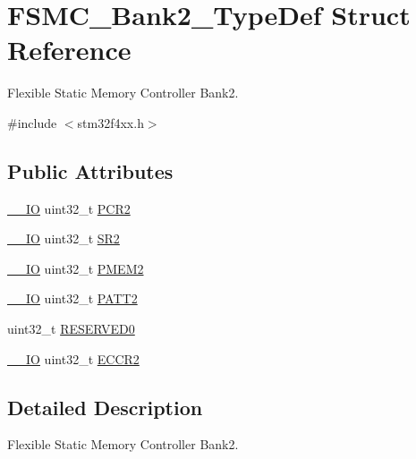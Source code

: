 \hypertarget{struct_f_s_m_c___bank2___type_def}{}\section{F\+S\+M\+C\+\_\+\+Bank2\+\_\+\+Type\+Def Struct Reference}
\label{struct_f_s_m_c___bank2___type_def}


Flexible Static Memory Controller Bank2.  




{\ttfamily \#include $<$stm32f4xx.\+h$>$}

\subsection*{Public Attributes}
\begin{DoxyCompactItemize}
\item 
\hyperlink{core__cm4_8h_aec43007d9998a0a0e01faede4133d6be}{\+\_\+\+\_\+\+IO} uint32\+\_\+t \hyperlink{struct_f_s_m_c___bank2___type_def_ad1eabc89a4eadb5cc6a42c1e39a39ff8}{P\+C\+R2}
\item 
\hyperlink{core__cm4_8h_aec43007d9998a0a0e01faede4133d6be}{\+\_\+\+\_\+\+IO} uint32\+\_\+t \hyperlink{struct_f_s_m_c___bank2___type_def_a38ad7403e05c899dc266cf47f932cc8f}{S\+R2}
\item 
\hyperlink{core__cm4_8h_aec43007d9998a0a0e01faede4133d6be}{\+\_\+\+\_\+\+IO} uint32\+\_\+t \hyperlink{struct_f_s_m_c___bank2___type_def_a29b2b75e74520e304e31c18cf9e4a7f8}{P\+M\+E\+M2}
\item 
\hyperlink{core__cm4_8h_aec43007d9998a0a0e01faede4133d6be}{\+\_\+\+\_\+\+IO} uint32\+\_\+t \hyperlink{struct_f_s_m_c___bank2___type_def_a9b2c273e4b84f24efbd731bd4ba76a84}{P\+A\+T\+T2}
\item 
uint32\+\_\+t \hyperlink{struct_f_s_m_c___bank2___type_def_ac0433330a92f2bd04812384f63bb4a52}{R\+E\+S\+E\+R\+V\+E\+D0}
\item 
\hyperlink{core__cm4_8h_aec43007d9998a0a0e01faede4133d6be}{\+\_\+\+\_\+\+IO} uint32\+\_\+t \hyperlink{struct_f_s_m_c___bank2___type_def_afebea17b3ac79d86ad59ce299ab5dd83}{E\+C\+C\+R2}
\end{DoxyCompactItemize}


\subsection{Detailed Description}
Flexible Static Memory Controller Bank2. 


